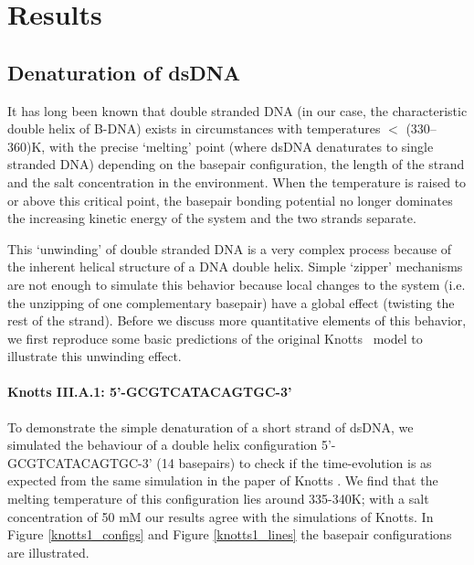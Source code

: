 \section{Results}

\subsection{Denaturation of dsDNA}

It has long been known that double stranded DNA (in our case, the characteristic double helix of B-DNA) exists in circumstances with temperatures $<$ (330--360)K, with the precise `melting' point (where dsDNA denaturates to single stranded DNA) depending on the basepair configuration, the length of the strand and the salt concentration in the environment. When the temperature is raised to or above this critical point, the basepair bonding potential no longer dominates the increasing kinetic energy of the system and the two strands separate. 

This `unwinding' of double stranded DNA is a very complex process because of the inherent helical structure of a DNA double helix. Simple `zipper' mechanisms are not enough to simulate this behavior because local changes to the system (i.e. the unzipping of one complementary basepair) have a global effect (twisting the rest of the strand). Before we discuss more quantitative elements of this behavior, we first reproduce some basic predictions of the original Knotts \etal\ model \cite{knotts2007coarse} to illustrate this unwinding effect.

\paragraph{Knotts III.A.1: 5'-GCGTCATACAGTGC-3'} To demonstrate the simple denaturation of a short strand of dsDNA, we simulated the behaviour of a double helix configuration 5'-GCGTCATACAGTGC-3' (14 basepairs) to check if the time-evolution is as expected from the same simulation in the paper of Knotts \etal \cite{knotts2007coarse}. We find that the melting temperature of this configuration lies around 335-340K; with a salt concentration of 50 mM our results agree with the simulations of Knotts. In Figure \ref{knotts1_configs} and Figure \ref{knotts1_lines} the basepair configurations are illustrated.

